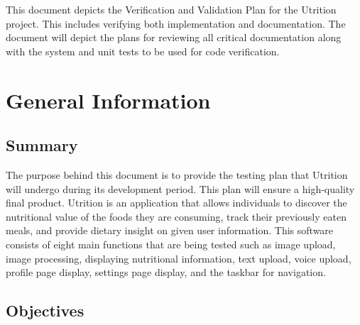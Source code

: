 \documentclass[12pt, titlepage]{article}
\begin{document}
	
	
	\newpage
	
	
	This document depicts the Verification and Validation Plan for the Utrition project. This includes verifying both implementation and documentation. The document will depict the plans for reviewing all critical documentation along with the system and unit tests to be used for code verification.  
	
	\section{General Information}
	
	\subsection{Summary}
	
		The purpose behind this document is to provide the testing plan that Utrition will undergo during its development period. This plan will ensure a high-quality final product. Utrition is an application that allows individuals to discover the nutritional value of the foods they are consuming, track their previously eaten meals, and provide dietary insight on given user information. This software consists of eight main functions that are being tested such as image upload, image processing, displaying nutritional information, text upload, voice upload, profile page display, settings page display, and the taskbar for navigation.
	
	\subsection{Objectives}
	
		
\end{document}
